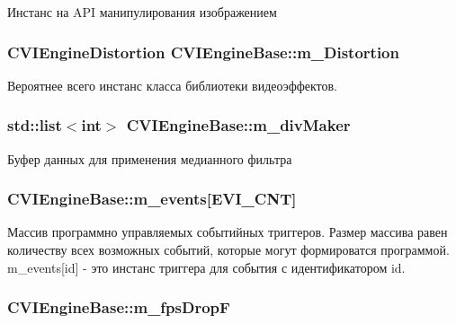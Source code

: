 Инстанс на A\+P\+I манипулирования изображением 

\hypertarget{class_c_v_i_engine_base_a5f19c0757146848a5e16bbe1a2a8d6f9}{
\subsubsection[{m\+\_\+\+Distortion}]{\setlength{\rightskip}{0pt plus 5cm}C\+V\+I\+Engine\+Distortion C\+V\+I\+Engine\+Base\+::m\+\_\+\+Distortion}}\label{class_c_v_i_engine_base_a5f19c0757146848a5e16bbe1a2a8d6f9}


Вероятнее всего инстанс класса библиотеки видеоэффектов. 

\hypertarget{class_c_v_i_engine_base_a63cd16114d368eec7c2bce4c4ac8e9c8}{
\subsubsection[{m\+\_\+div\+Maker}]{\setlength{\rightskip}{0pt plus 5cm}std\+::list$<$int$>$ C\+V\+I\+Engine\+Base\+::m\+\_\+div\+Maker}}\label{class_c_v_i_engine_base_a63cd16114d368eec7c2bce4c4ac8e9c8}


Буфер данных для применения медианного фильтра 

\hypertarget{class_c_v_i_engine_base_a88f59347ca703a36ea9965b96b3ab552}{
\subsubsection[{m\+\_\+events}]{ C\+V\+I\+Engine\+Base\+::m\+\_\+events\mbox{[}E\+V\+I\+\_\+\+C\+N\+T\mbox{]}}}\label{class_c_v_i_engine_base_a88f59347ca703a36ea9965b96b3ab552}


Массив программно управляемых событийных триггеров. Размер массива равен количеству всех возможных событий, которые могут формироватся программой. m\+\_\+events\mbox{[}id\mbox{]} -\/ это инстанс триггера для события с идентификатором id. 

\hypertarget{class_c_v_i_engine_base_afe15eeaa45219bf0b4c4ffbf08887d4a}{
\subsubsection[{m\+\_\+fps\+Drop\+F}]{ C\+V\+I\+Engine\+Base\+::m\+\_\+fps\+Drop\+F}}\label{class_c_v_i_engine_base_afe15eeaa45219bf0b4c4ffbf08887d4a}


